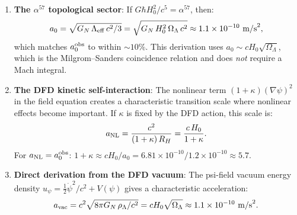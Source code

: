 \documentclass[11pt]{article}
\newcommand{\ee}[1]{\times 10^{#1}}
\newcommand{\GN}{G_N}
\newcommand{\Hzero}{H_0}
\begin{document}
\begin{enumerate}[label=(\roman*)]
  \item \textbf{The $\alpha^{57}$ topological sector}: If $G\hbar H_0^2/c^5
    = \alpha^{57}$, then:
    \begin{equation}
      a_0 = \sqrt{\GN\,\Lambda_{\rm eff}\,c^2/3}
      = \sqrt{\GN\,H_0^2\,\Omega_\Lambda\,c^2}
      \approx 1.1\ee{-10}~\text{m/s}^2,
    \end{equation}
    which matches $a_0^{\rm obs}$ to within $\sim 10\%$. This derivation uses
    $a_0 \sim c\Hzero\sqrt{\Omega_\Lambda}$, which is the Milgrom--Sanders
    coincidence relation and does \emph{not} require a Mach integral.

  \item \textbf{The DFD kinetic self-interaction}: The nonlinear term
    $(1+\kappa)(\nabla\psi)^2$ in the field equation creates a characteristic
    transition scale where nonlinear effects become important. If $\kappa$
    is fixed by the DFD action, this scale is:
    \begin{equation}
      a_{\rm NL} = \frac{c^2}{(1+\kappa)\,R_H} = \frac{c\,\Hzero}{1+\kappa}.
    \end{equation}
    For $a_{\rm NL} = a_0^{\rm obs}$: $1+\kappa \approx c\Hzero/a_0
    = 6.81\ee{-10}/1.2\ee{-10} \approx 5.7$.

  \item \textbf{Direct derivation from the DFD vacuum}: The psi-field
    vacuum energy density $u_\psi = \frac{1}{2}\dot\psi^2/c^2 + V(\psi)$
    gives a characteristic acceleration:
    \begin{equation}
      a_{\rm vac} = c^2\sqrt{8\pi \GN\,\rho_\Lambda/c^2}
      = c\Hzero\sqrt{\Omega_\Lambda} \approx 1.1\ee{-10}~\text{m/s}^2.
    \end{equation}
\end{enumerate}
\end{document}
